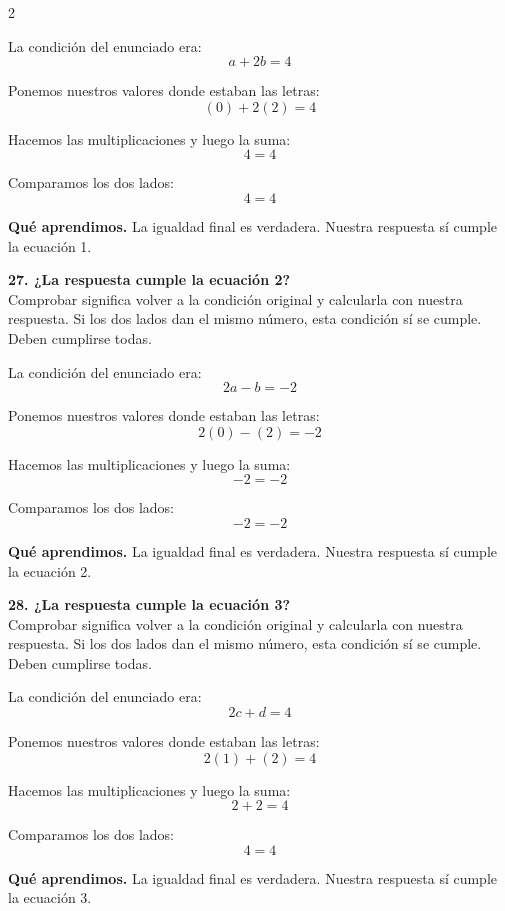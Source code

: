 \documentclass[11pt,a4paper,landscape]{article}
\begin{document}
\begin{multicols*}{2}
\begin{minipage}{\linewidth}
\par\smallskip La condición del enunciado era:
\[a + 2b = 4\]
\par\smallskip Ponemos nuestros valores donde estaban las letras:
\[\left(0\right) + 2\left(2\right)=4\]
\par\smallskip Hacemos las multiplicaciones y luego la suma:
\[4=4\]
\par\smallskip Comparamos los dos lados:
\[4=4\]
\par\smallskip\textbf{Qué aprendimos.} La igualdad final es verdadera. Nuestra respuesta sí cumple la ecuación 1.
\end{minipage}\par\medskip
\noindent\begin{minipage}{\linewidth}\textbf{27. ¿La respuesta cumple la ecuación 2?}\\[2pt]Comprobar significa volver a la condición original y calcularla con nuestra respuesta. Si los dos lados dan el mismo número, esta condición sí se cumple. Deben cumplirse todas.
\par\smallskip La condición del enunciado era:
\[2a - b = -2\]
\par\smallskip Ponemos nuestros valores donde estaban las letras:
\[2\left(0\right) - \left(2\right)=-2\]
\par\smallskip Hacemos las multiplicaciones y luego la suma:
\[-2=-2\]
\par\smallskip Comparamos los dos lados:
\[-2=-2\]
\par\smallskip\textbf{Qué aprendimos.} La igualdad final es verdadera. Nuestra respuesta sí cumple la ecuación 2.
\end{minipage}\par\medskip
\noindent\begin{minipage}{\linewidth}\textbf{28. ¿La respuesta cumple la ecuación 3?}\\[2pt]Comprobar significa volver a la condición original y calcularla con nuestra respuesta. Si los dos lados dan el mismo número, esta condición sí se cumple. Deben cumplirse todas.
\par\smallskip La condición del enunciado era:
\[2c + d = 4\]
\par\smallskip Ponemos nuestros valores donde estaban las letras:
\[2\left(1\right) + \left(2\right)=4\]
\par\smallskip Hacemos las multiplicaciones y luego la suma:
\[2 + 2=4\]
\par\smallskip Comparamos los dos lados:
\[4=4\]
\par\smallskip\textbf{Qué aprendimos.} La igualdad final es verdadera. Nuestra respuesta sí cumple la ecuación 3.

\end{minipage}
\end{multicols*}
\end{document}
